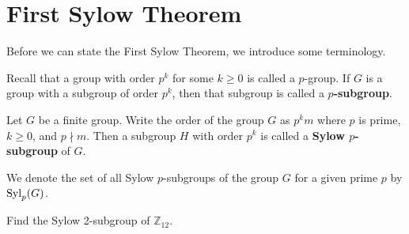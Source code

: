 \section{First Sylow Theorem}
Before we can state the First Sylow Theorem, we introduce some terminology.

Recall that a group with order $p^k$ for some $k \geq 0$ is called a $p$-group. If $G$ is a group with a subgroup of order $p^k$, then that subgroup is called a \textbf{$p$-subgroup}.
\begin{definition}\label{definition-sylow-p-subgroup}
    Let $G$ be a finite group. Write the order of the group $G$ as $p^k m$ where $p$ is prime, $k \geq 0$, and $p \nmid m$. Then a subgroup $H$ with order $p^k$ is called a \textbf{Sylow $p$-subgroup} of $G$.
\end{definition}
We denote the set of all Sylow $p$-subgroups of the group $G$ for a given prime $p$ by $\mathrm{Syl}_{p}(G)$.

\begin{exercise}
    Find the Sylow 2-subgroup of $\mathbb{Z}_{12}$.
\end{exercise}

\newpage

